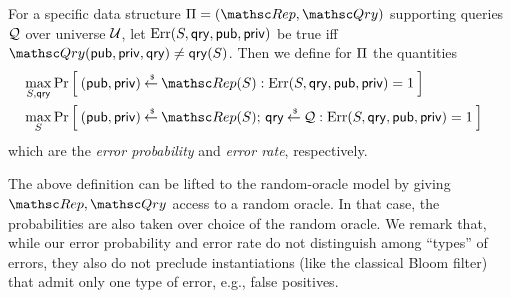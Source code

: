 
\begin{definition} \rm
For a specific data structure $\setprim=(\Rep, \Qry)$ supporting
queries ${\cal Q}$ over universe ${\cal U}$, let
$\mathrm{Err}(S,\mathsf{qry},{\sf pub},{\sf priv})$ be  true iff
$\Qry(\pubaux,\privaux, \qry) \neq \qry(S)$.  Then we define for
$\Pi$ the quantities
\begin{align*}
&\max_{S,\qry}\Prob{(\pubaux,\privaux) \getsr \Rep(S) :
\mathrm{Err}(S,\qry,\pubaux,\privaux)=1 } &\\
&\max_{S}\Prob{(\pubaux,\privaux) \getsr \Rep(S);\, \qry \getsr \calQ :
\mathrm{Err}(S,\qry,\pubaux,\privaux)=1} &
\end{align*}
which are the \emph{error probability} and \emph{error rate}, respectively.
%
\hfill\dqed
\end{definition}



The above definition can be lifted to the random-oracle model by
giving $\Rep, \Qry$ access to a random oracle. In that case, the
probabilities are also taken over choice of the random oracle. We
remark that, while our error probability and error rate do not
distinguish among ``types'' of errors, they also do not preclude
instantiations (like the classical Bloom filter) that admit only one
type of error, e.g., false positives.


